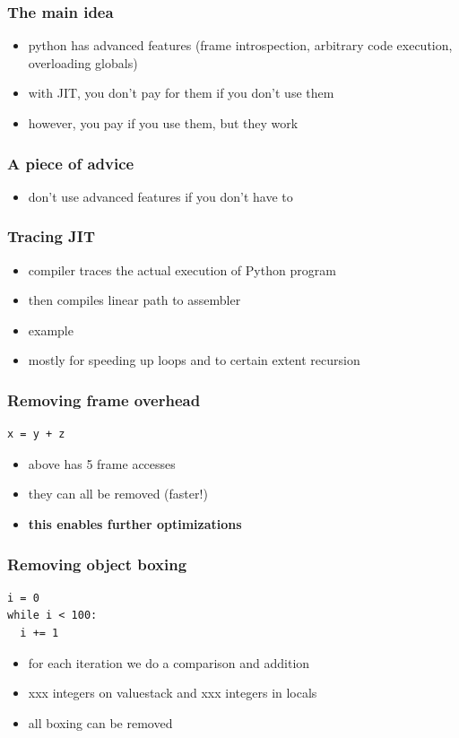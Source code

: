 \documentclass[utf8x, 14pt]{beamer}
\begin{document}
\begin{frame}
  \frametitle{The main idea}
  \begin{itemize}
    \item python has advanced features (frame introspection,
      arbitrary code execution, overloading globals)
    \item with JIT, you don't pay for them if you don't use
      them
    \item however, you pay if you use them, but they work
  \end{itemize}
\end{frame}

\begin{frame}
  \frametitle{A piece of advice}
  \begin{itemize}
    \item don't use advanced features if you don't have to
  \end{itemize}
\end{frame}

\begin{frame}
  \frametitle{Tracing JIT}
  \begin{itemize}
    \item compiler traces the actual execution of Python program
    \item then compiles linear path to assembler
    \item example
    \item mostly for speeding up loops and to certain extent
      recursion
  \end{itemize}
\end{frame}

\begin{frame}[fragile]
  \frametitle{Removing frame overhead}
  \begin{verbatim}
x = y + z
  \end{verbatim}
  \begin{itemize}
    \item above has 5 frame accesses
    \item they can all be removed (faster!)
      \pause
    \item {\bf this enables further optimizations}
  \end{itemize}
\end{frame}

\begin{frame}[fragile]
  \frametitle{Removing object boxing}
  \begin{verbatim}
i = 0
while i < 100:
  i += 1
  \end{verbatim}
  \begin{itemize}
    \item for each iteration we do a comparison and addition
    \item xxx integers on valuestack and xxx integers in locals
    \item all boxing can be removed
  \end{itemize}
\end{frame}
\end{document}
